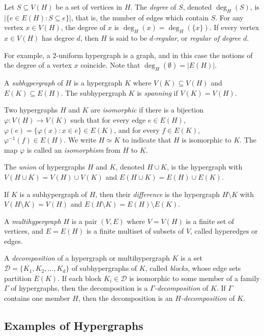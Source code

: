 Let $S \subseteq V(H)$ be a set of vertices in $H$. The {\em degree} of $S$,
denoted $\deg_H(S)$, is $|\{e \in E(H) : S \subseteq e\}|$, that is, the number
of edges which contain $S$.
For any vertex $x \in V(H)$, the degree of $x$ is $\deg_H(x) = \deg_H(\{x\})$.
If every vertex $x \in V(H)$ has degree $d$, then $H$ is said to be {\em $d$-regular}, or {\em regular of degree $d$}.

For example, a $2$-uniform hypergraph is a graph, and in this case the notions
of the degree of a vertex $x$ coincide. Note that $\deg_H(\emptyset) = |E(H)|$.

A {\em subhypergraph} of $H$ is a hypergraph $K$ where $V(K) \subseteq V(H)$ and $E(K) \subseteq E(H)$. The subhypergraph $K$ is {\em spanning} if $V(K) = V(H)$.

Two hypergraphs $H$ and $K$ are {\em isomorphic} if there is a bijection
$\varphi : V(H) \to V(K)$ such that for every edge $e \in E(H)$,
$\varphi(e) = \{\varphi(x) : x \in e\} \in E(K)$, and for every
$f \in E(K)$, $\varphi^{-1}(f) \in E(H)$.
We write $H \simeq K$ to indicate that $H$ is isomorphic to $K$.
The map $\varphi$ is called an {\em isomorphism} from $H$ to $K$.

The {\em union} of hypergraphs $H$ and $K$, denoted
$H \cup K$, is the hypergraph with $V(H \cup K) = V(H) \cup V(K)$ and
$E(H \cup K) = E(H) \cup E(K)$.

If $K$ is a subhypergraph of $H$, then their {\em difference}
is the hypergraph $H \setminus K$ with $V(H \setminus K) = V(H)$ and
$E(H \setminus K) = E(H) \setminus E(K)$.

A {\em multihypergraph} $H$ is a pair $(V, E)$ where $V = V(H)$ is a finite set
of vertices, and $E = E(H)$ is a finite multiset of subsets of $V$, called
hyperedges or edges.

A {\em decomposition} of a hypergraph or multihypergraph $K$ is a set $\mathcal{D} = \{K_1, K_2, \ldots, K_d\}$ of subhypergraphs of $K$, called {\em blocks}, whose edge sets partition $E(K)$.
If each block $K_i \in \mathcal{D}$ is isomorphic to some member
of a family $\Gamma$ of hypergraphs, then the decomposition is a {\em
$\Gamma$-decomposition} of $K$. If $\Gamma$ contains one member $H$, then the
decomposition is an {\em $H$-decomposition} of $K$.

\subsection{Examples of Hypergraphs}


